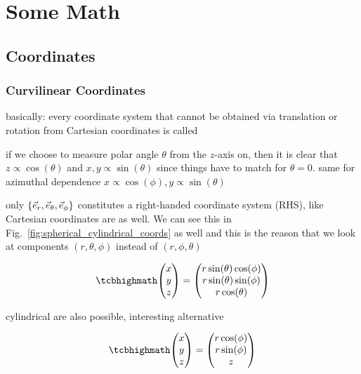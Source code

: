 \documentclass[../class_mech_main.tex]{subfiles}
\begin{document}
\chapter{Some Math}




    \section{Coordinates}

        \subsection{Curvilinear Coordinates}
basically: every coordinate system that cannot be obtained via translation or rotation from Cartesian coordinates is called 


if we choose to measure polar angle $\theta$ from the $z$-axis on, then it is clear that $z \propto \cos(\theta)$ and $x, y \propto \sin(\theta)$ since things have to match for $\theta = 0$. same for azimuthal dependence $x \propto \cos(\phi), y \propto \sin(\theta)$


only $\qty{\vec{e}_r, \vec{e}_\theta, \vec{e}_\phi}$ constitutes a right-handed coordinate system (RHS), like Cartesian coordinates are as well. We can see this in Fig.~\ref{fig:spherical_cylindrical_coords} as well and this is the reason that we look at components $(r, \theta, \phi)$ instead of $(r, \phi, \theta)$


\begin{equation}\label{eq:spherical_coords}
    \eqbox{
        \mqty(x \\ y \\ z) = \mqty(r \sin(\theta) \cos(\phi) \\ r \sin(\theta) \sin(\phi) \\ r \cos(\theta))
    }
\end{equation}



cylindrical are also possible, interesting alternative

\begin{equation}\label{eq:cylindrical_coords}
    \eqbox{
        \mqty(x \\ y \\ z) = \mqty(r \cos(\phi) \\ r \sin(\phi) \\ z)
    }
\end{equation}
\end{document}
